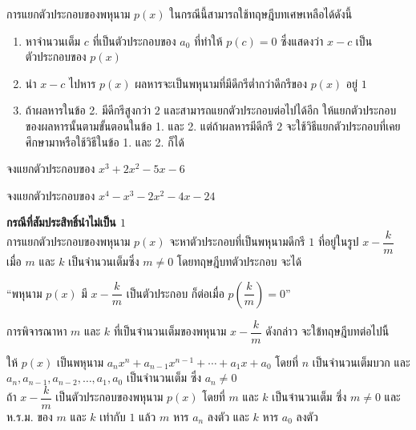 \vspace{0.5em}
การแยกตัวประกอบของพหุนาม $p(x)$ ในกรณีนี้สามารถใช้ทฤษฎีบทเศษเหลือได้ดังนี้
\begin{conceptbox}
	\begin{enumerate}[label=\arabic*., leftmargin=2em, itemsep=0.4em]
	\item หาจำนวนเต็ม $c$ ที่เป็นตัวประกอบของ $a_0$ ที่ทำให้ $p(c) = 0$ ซึ่งแสดงว่า $x-c$ เป็นตัวประกอบของ $p(x)$
	\item นำ $x-c$ ไปหาร $p(x)$ ผลหารจะเป็นพหุนามที่มีดีกรีต่ำกว่าดีกรีของ $p(x)$ อยู่ $1$
	\item ถ้าผลหารในข้อ 2. มีดีกรีสูงกว่า $2$ และสามารถแยกตัวประกอบต่อไปได้อีก ให้แยกตัวประกอบของผลหารนั้นตามขั้นตอนในข้อ 1. และ 2. แต่ถ้าผลหารมีดีกรี $2$ จะใช้วิธีแยกตัวประกอบที่เคยศึกษามาหรือใช้วิธีในข้อ 1. และ 2. ก็ได้
\end{enumerate}
\end{conceptbox}

\vspace{1em}

\begin{examplebox}
	จงแยกตัวประกอบของ $x^3 + 2x^2 - 5x - 6$
\end{examplebox}
\solution
\newpage

\begin{examplebox}
	จงแยกตัวประกอบของ $x^4 - x^3 - 2x^2 - 4x - 24$
\end{examplebox}
\solution
\newpage

\noindent\textbf{กรณีที่สัมประสิทธิ์นำไม่เป็น $1$} \\[0.5em]
การแยกตัวประกอบของพหุนาม $p(x)$ จะหาตัวประกอบที่เป็นพหุนามดีกรี $1$ ที่อยู่ในรูป $x - \dfrac{k}{m}$ เมื่อ $m$ และ $k$ เป็นจำนวนเต็มซึ่ง $m \neq 0$ โดยทฤษฎีบทตัวประกอบ จะได้
\begin{center}
	``พหุนาม $p(x)$ มี $x - \dfrac{k}{m}$ เป็นตัวประกอบ ก็ต่อเมื่อ $p\left(\dfrac{k}{m}\right) = 0$''
\end{center}
การพิจารณาหา $m$ และ $k$ ที่เป็นจำนวนเต็มของพหุนาม $x - \dfrac{k}{m}$ ดังกล่าว จะใช้ทฤษฎีบทต่อไปนี้

\begin{theorembox}
	ให้ $p(x)$ เป็นพหุนาม $a_n x^n + a_{n-1} x^{n-1} + \cdots + a_1 x + a_0$ โดยที่ $n$ เป็นจำนวนเต็มบวก และ $a_n, a_{n-1}, a_{n-2}, \ldots, a_1, a_0$ เป็นจำนวนเต็ม ซึ่ง $a_n \neq 0$
	\\[0.5em]
	ถ้า $x - \dfrac{k}{m}$ เป็นตัวประกอบของพหุนาม $p(x)$ โดยที่ $m$ และ $k$ เป็นจำนวนเต็ม ซึ่ง $m \neq 0$ และ ห.ร.ม. ของ $m$ และ $k$ เท่ากับ $1$ แล้ว $m$ หาร $a_n$ ลงตัว และ $k$ หาร $a_0$ ลงตัว
\end{theorembox}

